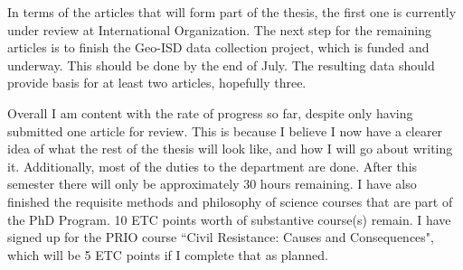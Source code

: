 \documentclass[12pt]{article}
\begin{document}
In terms of the articles that will form part of the thesis, the first one is 
currently under review at International Organization.
The next step for the remaining articles is to finish the Geo-ISD data 
collection project, which is funded and underway.
This should be done by the end of July.
The resulting data should provide basis for at least two articles, hopefully 
three.

Overall I am content with the rate of progress so far, despite only having 
submitted one article for review.
This is because I believe I now have a clearer idea of what the rest of the 
thesis will look like, and how I will go about writing it.
Additionally, most of the duties to the department are done.
After this semester there will only be approximately 30 hours remaining.
I have also finished the requisite methods and philosophy of science courses 
that are part of the PhD Program.
10 ETC points worth of substantive course(s) remain.
I have signed up for the PRIO course ``Civil Resistance: Causes and 
Consequences", which will be 5 ETC points if I complete that as planned.


\pagebreak


\end{document}
